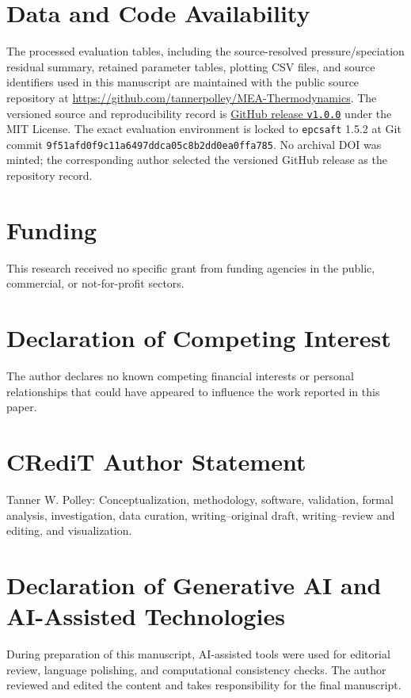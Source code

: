 \section*{Data and Code Availability}
The processed evaluation tables, including the source-resolved pressure/speciation residual summary, retained parameter tables, plotting CSV files, and source identifiers used in this manuscript are maintained with the public source repository at \url{https://github.com/tannerpolley/MEA-Thermodynamics}.  The versioned source and reproducibility record is \href{https://github.com/tannerpolley/MEA-Thermodynamics/releases/tag/v1.0.0}{GitHub release \texttt{v1.0.0}} under the MIT License.  The exact evaluation environment is locked to \texttt{epcsaft} 1.5.2 at Git commit \texttt{9f51afd0f9c11a6497ddca05c8b2dd0ea0ffa785}.  No archival DOI was minted; the corresponding author selected the versioned GitHub release as the repository record.

\section*{Funding}
This research received no specific grant from funding agencies in the public, commercial, or not-for-profit sectors.

\section*{Declaration of Competing Interest}
The author declares no known competing financial interests or personal relationships that could have appeared to influence the work reported in this paper.

\section*{CRediT Author Statement}
Tanner W. Polley: Conceptualization, methodology, software, validation, formal analysis, investigation, data curation, writing--original draft, writing--review and editing, and visualization.

\section*{Declaration of Generative AI and AI-Assisted Technologies}
During preparation of this manuscript, AI-assisted tools were used for editorial review, language polishing, and computational consistency checks.  The author reviewed and edited the content and takes responsibility for the final manuscript.
